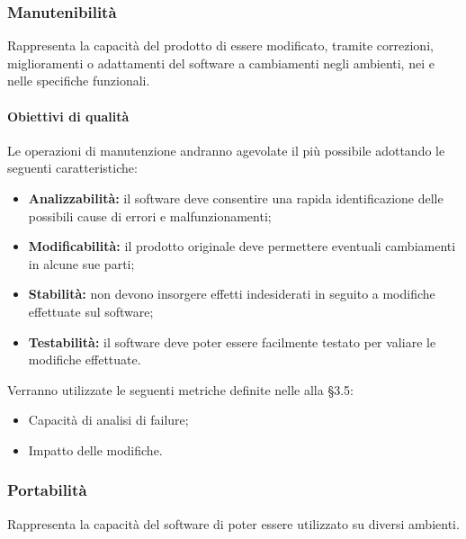 \documentclass[PianoDiQualifica.tex]{subfiles}
\begin{document}
\subsubsection{Manutenibilità}
Rappresenta la capacità del prodotto di essere modificato, tramite correzioni, miglioramenti o adattamenti del software a cambiamenti negli ambienti, nei  e nelle specifiche funzionali.
\paragraph{Obiettivi di qualità}
Le operazioni di manutenzione andranno agevolate il più possibile adottando le seguenti caratteristiche:
\begin{itemize}
	\item \textbf{Analizzabilità:} il software deve consentire una rapida identificazione delle possibili cause di errori e malfunzionamenti;
	\item \textbf{Modificabilità:} il prodotto originale deve permettere eventuali cambiamenti in alcune sue parti;
	\item \textbf{Stabilità:} non devono insorgere effetti indesiderati in seguito a modifiche effettuate sul software;
	\item \textbf{Testabilità:} il software deve poter essere facilmente testato per valiare le modifiche effettuate.
\end{itemize}
Verranno utilizzate le seguenti metriche definite nelle \ndp alla \S{3.5}:
\begin{itemize}
	\item {} Capacità di analisi di failure;
	\item {} Impatto delle modifiche.
\end{itemize}

\subsubsection{Portabilità}
Rappresenta la capacità del software di poter essere utilizzato su diversi ambienti.
\end{document}
